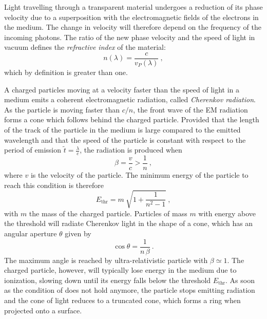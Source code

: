Light travelling through a transparent material undergoes a reduction of its phase velocity %
due to a superposition with the electromagnetic fields of the electrons in the medium. %
The change in velocity will therefore depend on the frequency of the incoming photons.
The ratio of the new phase velocity and the speed of light in vacuum defines the \emph{refractive index} %
of the material:
\begin{equation}
	\label{eq:ref_index}
	n(\lambda) = \frac{c}{v_P(\lambda)}\ ,
\end{equation}
which by definition is greater than one.

A charged particles moving at a velocity faster than the speed of light in a medium %
emits a coherent electromagnetic radiation, called \emph{Cherenkov radiation}. %
As the particle is moving faster than $c / n$, the front wave of the EM radiation forms a cone %
which follows behind the charged particle.
Provided that the length of the track of the particle in the medium is large compared to the emitted wavelength %
and that the speed of the particle is constant with respect to the period of emission $\tilde{t} = \frac{\lambda}{c}$,
the radiation is produced when
\begin{equation}
	\label{eq:cherenkov}
	\beta = \frac{v}{c} > \frac{1}{n}\ ,
\end{equation}
where $v$ is the velocity of the particle.
The minimum energy of the particle to reach this condition is therefore
\begin{equation}
	\label{eq:cherenkov_threshold}
	E_\text{thr} = m\ \sqrt{1 + \frac{1}{n^2-1}}\ ,
\end{equation}
with $m$ the mass of the charged particle.
Particles of mass $m$ with energy above the threshold will radiate Cherenkov light in the shape of a cone, %
which has an angular aperture $\theta$ given by
\begin{equation}
	\cos \theta = \frac{1}{n\,\beta} \ .
\end{equation}
The maximum angle is reached by ultra-relativistic particle with $\beta \simeq 1$.
The charged particle, however, will typically lose energy in the medium due to ionization, %
slowing down until its energy falls below the threshold $E_\text{thr}$.
As soon as the condition of  does not hold anymore, %
the particle stops emitting radiation and the cone of light reduces to a truncated cone, %
which forms a ring when projected onto a surface.

